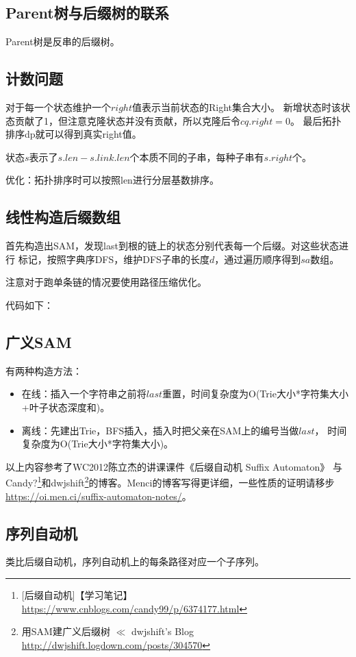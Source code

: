 \subsection{Parent树与后缀树的联系}
Parent树是反串的后缀树。
\subsection{计数问题}
对于每一个状态维护一个$right$值表示当前状态的Right集合大小。
新增状态时该状态贡献了1，但注意克隆状态并没有贡献，所以克隆后令$cq.right=0$。
最后拓扑排序dp就可以得到真实right值。

状态$s$表示了$s.len-s.link.len$个本质不同的子串，每种子串有$s.right$个。

优化：拓扑排序时可以按照len进行分层基数排序。
\subsection{线性构造后缀数组}
首先构造出SAM，发现last到根的链上的状态分别代表每一个后缀。对这些状态进行
标记，按照字典序DFS，维护DFS子串的长度$d$，通过遍历顺序得到$sa$数组。

注意对于跑单条链的情况要使用路径压缩优化。

代码如下：

\subsection{广义SAM}
有两种构造方法：
\begin{itemize}
    \item 在线：插入一个字符串之前将$last$重置，时间复杂度为O(Trie大小*字符集大小
    +叶子状态深度和)。
    \item 离线：先建出Trie，BFS插入，插入时把父亲在SAM上的编号当做$last$，
    时间复杂度为O(Trie大小*字符集大小)。
\end{itemize}

以上内容参考了WC2012陈立杰的讲课课件《后缀自动机 Suffix Automaton》
与Candy?\footnote{[后缀自动机]【学习笔记】
    \url{https://www.cnblogs.com/candy99/p/6374177.html}
}和dwjshift\footnote{
    用SAM建广义后缀树 $\ll$ dwjshift's Blog
    \url{http://dwjshift.logdown.com/posts/304570}
}的博客。Menci的博客写得更详细，一些性质的证明请移步
\url{https://oi.men.ci/suffix-automaton-notes/}。

\subsection{序列自动机}
类比后缀自动机，序列自动机上的每条路径对应一个子序列。

